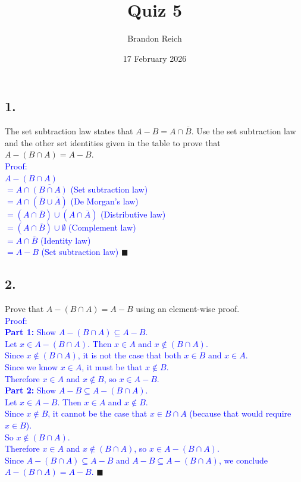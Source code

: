 \documentclass{article}
\title{Quiz 5}
\author{Brandon Reich}
\date{17 February 2026}
\begin{document}
\maketitle

\subsection*{1.}
The set subtraction law states that $A - B = A \cap \overline{B}$. Use the set subtraction law and the other set identities given in the table to prove that $A - (B \cap A) = A - B$. \\[1em]
\textcolor{blue}{Proof:} \\
\textcolor{blue}{$A - (B \cap A)$} \\
\textcolor{blue}{$= A \cap \overline{(B \cap A)}$ \hfill (Set subtraction law)} \\
\textcolor{blue}{$= A \cap (\overline{B} \cup \overline{A})$ \hfill (De Morgan's law)} \\
\textcolor{blue}{$= (A \cap \overline{B}) \cup (A \cap \overline{A})$ \hfill (Distributive law)} \\
\textcolor{blue}{$= (A \cap \overline{B}) \cup \emptyset$ \hfill (Complement law)} \\
\textcolor{blue}{$= A \cap \overline{B}$ \hfill (Identity law)} \\
\textcolor{blue}{$= A - B$ \hfill (Set subtraction law)} $\blacksquare$

\subsection*{2.}
Prove that $A - (B \cap A) = A - B$ using an element-wise proof. \\[1em]
\textcolor{blue}{Proof:} \\[0.5em]
\textcolor{blue}{\textbf{Part 1:} Show $A - (B \cap A) \subseteq A - B$.} \\
\textcolor{blue}{Let $x \in A - (B \cap A)$. Then $x \in A$ and $x \notin (B \cap A)$.} \\
\textcolor{blue}{Since $x \notin (B \cap A)$, it is not the case that both $x \in B$ and $x \in A$.} \\
\textcolor{blue}{Since we know $x \in A$, it must be that $x \notin B$.} \\
\textcolor{blue}{Therefore $x \in A$ and $x \notin B$, so $x \in A - B$.} \\[0.5em]
\textcolor{blue}{\textbf{Part 2:} Show $A - B \subseteq A - (B \cap A)$.} \\
\textcolor{blue}{Let $x \in A - B$. Then $x \in A$ and $x \notin B$.} \\
\textcolor{blue}{Since $x \notin B$, it cannot be the case that $x \in B \cap A$ (because that would require $x \in B$).} \\
\textcolor{blue}{So $x \notin (B \cap A)$.} \\
\textcolor{blue}{Therefore $x \in A$ and $x \notin (B \cap A)$, so $x \in A - (B \cap A)$.} \\[0.5em]
\textcolor{blue}{Since $A - (B \cap A) \subseteq A - B$ and $A - B \subseteq A - (B \cap A)$, we conclude $A - (B \cap A) = A - B$.} $\blacksquare$
\end{document}
